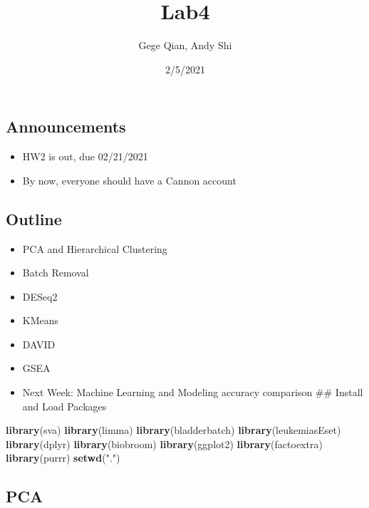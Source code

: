 \documentclass[
]{article}
\title{Lab4}
\author{Gege Qian, Andy Shi}
\date{2/5/2021}
\newenvironment{Shaded}{\begin{snugshade}}{\end{snugshade}}
\newcommand{\KeywordTok}[1]{\textcolor[rgb]{0.13,0.29,0.53}{\textbf{#1}}}
\newcommand{\NormalTok}[1]{#1}
\newcommand{\StringTok}[1]{\textcolor[rgb]{0.31,0.60,0.02}{#1}}
\providecommand{\tightlist}{%
  \setlength{\itemsep}{0pt}\setlength{\parskip}{0pt}}
\begin{document}
\maketitle

\hypertarget{announcements}{%
\subsection{Announcements}\label{announcements}}

\begin{itemize}
\tightlist
\item
  HW2 is out, due 02/21/2021
\item
  By now, everyone should have a Cannon account
\end{itemize}

\hypertarget{outline}{%
\subsection{Outline}\label{outline}}

\begin{itemize}
\tightlist
\item
  PCA and Hierarchical Clustering
\item
  Batch Removal
\item
  DESeq2
\item
  KMeans
\item
  DAVID
\item
  GSEA
\item
  Next Week: Machine Learning and Modeling accuracy comparison \#\#
  Install and Load Packages
\end{itemize}

\begin{Shaded}
\begin{Highlighting}[]
\KeywordTok{library}\NormalTok{(sva)}
\KeywordTok{library}\NormalTok{(limma)}
\KeywordTok{library}\NormalTok{(bladderbatch)}
\KeywordTok{library}\NormalTok{(leukemiasEset)}
\KeywordTok{library}\NormalTok{(dplyr)}
\KeywordTok{library}\NormalTok{(biobroom)}
\KeywordTok{library}\NormalTok{(ggplot2)}
\KeywordTok{library}\NormalTok{(factoextra)}
\KeywordTok{library}\NormalTok{(purrr)}
\KeywordTok{setwd}\NormalTok{(}\StringTok{"."}\NormalTok{)}
\end{Highlighting}
\end{Shaded}

\hypertarget{pca}{%
\subsection{PCA}\label{pca}}
\end{document}

